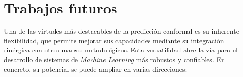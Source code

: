 
\section{Trabajos futuros}

Una de las virtudes más destacables de la predicción conformal es su inherente flexibilidad, que permite mejorar sus capacidades mediante su integración sinérgica con otros marcos metodológicos. Esta versatilidad abre la vía para el desarrollo de sistemas de \textit{Machine Learning} más robustos y confiables. En concreto, su potencial se puede ampliar en varias direcciones:

